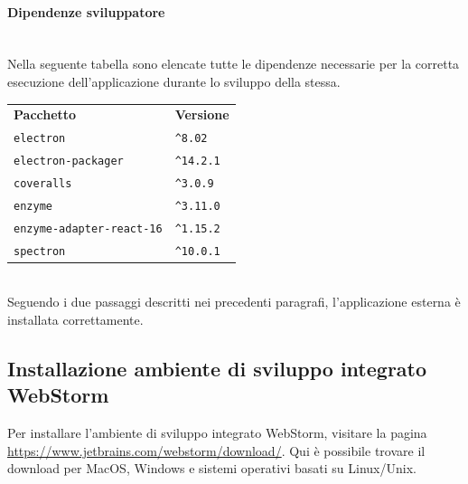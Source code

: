 \paragraph*{Dipendenze sviluppatore}\mbox{}\\ [1mm]
Nella seguente tabella sono elencate tutte le dipendenze necessarie per la corretta esecuzione dell'applicazione durante lo sviluppo della stessa.
	\setcounter{table}{0}
	\begin{longtable} {
		>{}p{65mm} 
		>{}p{30mm}
		}
    \rowcolor{gray!50}
    \textbf{Pacchetto} & \textbf{Versione} \TBstrut \\ [2mm]
    \verb|electron| & \verb|^8.02| \TBstrut \\ [2mm]
    \verb|electron-packager| & \verb|^14.2.1| \TBstrut \\ [2mm]
    \verb|coveralls| & \verb|^3.0.9| \TBstrut \\ [2mm]
    \verb|enzyme| & \verb|^3.11.0| \TBstrut \\ [2mm]
    \verb|enzyme-adapter-react-16| & \verb|^1.15.2| \TBstrut \\ [2mm]
    \verb|spectron| & \verb|^10.0.1| \TBstrut \\ [2mm]
    \end{longtable}
    \mbox{}\\ [1mm]
Seguendo i due passaggi descritti nei precedenti paragrafi, l'applicazione esterna è installata correttamente.

\subsection{Installazione ambiente di sviluppo integrato WebStorm}
Per installare l'ambiente di sviluppo integrato WebStorm, visitare la pagina \url{https://www.jetbrains.com/webstorm/download/}. Qui è possibile trovare il download per MacOS, Windows e sistemi operativi basati su Linux/Unix.
\\


